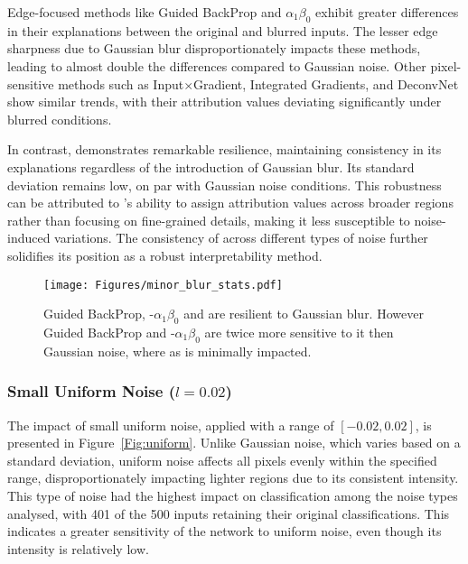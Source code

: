 Edge-focused methods like Guided BackProp and \LRP\-$\alpha_1\beta_0$ exhibit greater differences in their explanations between the original and blurred inputs. The lesser edge sharpness due to Gaussian blur disproportionately impacts these methods, leading to almost double the differences compared to Gaussian noise. Other pixel-sensitive methods such as Input$\times$Gradient, Integrated Gradients, and DeconvNet show similar trends, with their attribution values deviating significantly under blurred conditions.

In contrast, \CTC\/ demonstrates remarkable resilience, maintaining consistency in its explanations regardless of the introduction of Gaussian blur. Its standard deviation remains low, on par with Gaussian noise conditions. This robustness can be attributed to \CTC\/'s ability to assign attribution values across broader regions rather than focusing on fine-grained details, making it less susceptible to noise-induced variations. The consistency of \CTC\/ across different types of noise further solidifies its position as a robust interpretability method.

\begin{figure}[ht!]
	\begin{center}
		\texttt{[image: Figures/minor\_blur\_stats.pdf]}
	\end{center}
	\caption{Guided BackProp, \LRP-$\alpha_1\beta_0$ and \CTC\/ are resilient to  Gaussian blur. However Guided BackProp and \LRP-$\alpha_1\beta_0$ are twice more sensitive to it then Gaussian noise, where as \CTC\/ is minimally impacted.}
	\label{Fig:blur}
\end{figure} 

\subsubsection{Small Uniform Noise ($l = 0.02$)}

The impact of small uniform noise, applied with a range of $[-0.02, 0.02]$, is presented in Figure~\ref{Fig:uniform}. Unlike Gaussian noise, which varies based on a standard deviation, uniform noise affects all pixels evenly within the specified range, disproportionately impacting lighter regions due to its consistent intensity. This type of noise had the highest impact on classification among the noise types analysed, with 401 of the 500 inputs retaining their original classifications. This indicates a greater sensitivity of the network to uniform noise, even though its intensity is relatively low.

